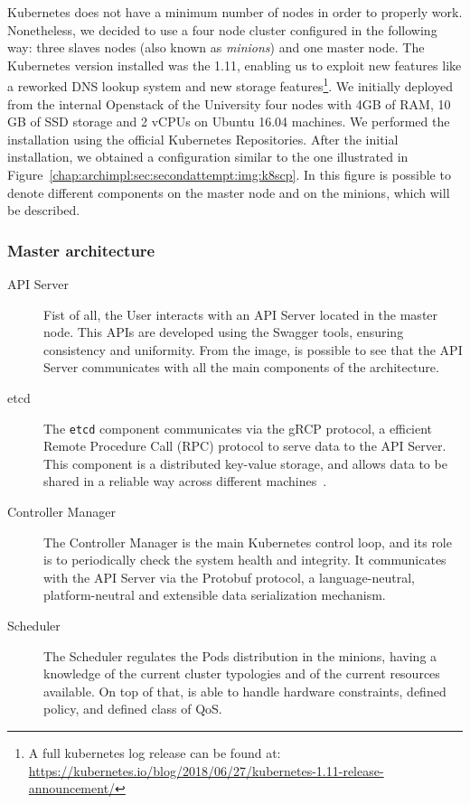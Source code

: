 Kubernetes does not have a minimum number of nodes in order to properly work.
Nonetheless, we decided to use a four node cluster configured in the following
way: three slaves nodes (also known as \emph{minions}) and one master node. The
Kubernetes version installed was the 1.11, enabling us to exploit new features
like a reworked DNS lookup system and new storage features\footnote{A full
  kubernetes log release can be found at:
  \url{https://kubernetes.io/blog/2018/06/27/kubernetes-1.11-release-announcement/}}.
We initially deployed from the internal Openstack of the University four nodes
with 4GB of RAM, 10 GB of SSD storage and 2 vCPUs on Ubuntu 16.04 machines. We
performed the installation using the official Kubernetes Repositories. After the
initial installation, we obtained a configuration similar to the one illustrated
in Figure~\ref{chap:archimpl:sec:secondattempt:img:k8scp}. In this figure is
possible to denote different components on the master node and on the minions,
which will be described.

\subsubsection{Master architecture}
\begin{description}
\item[API Server] Fist of all, the User interacts with an API Server located in
  the master node. This APIs are developed using the Swagger tools, ensuring
  consistency and uniformity. From the image, is possible to see that the API
  Server communicates with all the main components of the architecture.
\item[etcd] The \verb!etcd! component communicates via the gRCP protocol, a
  efficient Remote Procedure Call (RPC) protocol to serve data to the API
  Server. This component is a distributed key-value storage, and allows data to
  be shared in a reliable way across different machines~\cite{etcddatamodel}.
\item[Controller Manager] The Controller Manager is the main Kubernetes control
  loop, and its role is to periodically check the system health and integrity.
  It communicates with the API Server via the Protobuf protocol, a
  language-neutral, platform-neutral and extensible data serialization
  mechanism.
\item[Scheduler] The Scheduler regulates the Pods distribution in the minions,
  having a knowledge of the current cluster typologies and of the current
  resources available. On top of that, is able to handle hardware constraints,
  defined policy, and defined class of QoS.
\end{description}

